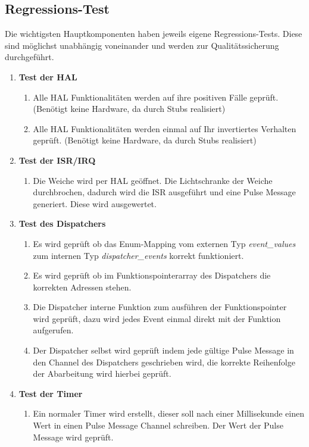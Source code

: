 \documentclass[oneside,a4paper,titlepage]{scrartcl}              %
\begin{document}
\newpage

\subsection{Regressions-Test}
Die wichtigsten Hauptkomponenten haben jeweils eigene Regressions-Tests. Diese sind möglichst unabhängig voneinander und werden zur Qualitätssicherung durchgeführt.
\begin{enumerate}
  \item \textbf{Test der HAL}
  \begin{enumerate}
    \item Alle HAL Funktionalitäten werden auf ihre positiven Fälle geprüft. (Benötigt keine Hardware, da durch Stubs realisiert)
    \item Alle HAL Funktionalitäten werden einmal auf Ihr invertiertes Verhalten geprüft. (Benötigt keine Hardware, da durch Stubs realisiert)
  \end{enumerate}
  \item \textbf{Test der ISR/IRQ}
  \begin{enumerate}
    \item Die Weiche wird per HAL geöffnet. Die Lichtschranke der Weiche durchbrochen, dadurch wird die ISR ausgeführt und eine Pulse Message generiert. Diese wird ausgewertet.
  \end{enumerate}
  \item \textbf{Test des Dispatchers}
  \begin{enumerate}
    \item Es wird geprüft ob das Enum-Mapping vom externen Typ \emph{event\_values} zum internen Typ \emph{dispatcher\_events} korrekt funktioniert.
    \item Es wird geprüft ob im Funktionspointerarray des Dispatchers die korrekten Adressen stehen.
    \item Die Dispatcher interne Funktion zum ausführen der Funktionspointer wird geprüft, dazu wird jedes Event einmal direkt mit der Funktion aufgerufen.
    \item Der Dispatcher selbst wird geprüft indem jede gültige Pulse Message in den Channel des Dispatchers geschrieben wird, die korrekte Reihenfolge der Abarbeitung wird hierbei geprüft.
  \end{enumerate}
  \item \textbf{Test der Timer}
  \begin{enumerate}
    \item Ein normaler Timer wird erstellt, dieser soll nach einer Millisekunde einen Wert in einen Pulse Message Channel schreiben. Der Wert der Pulse Message wird geprüft.

\end{enumerate}
\end{enumerate}
\end{document}
